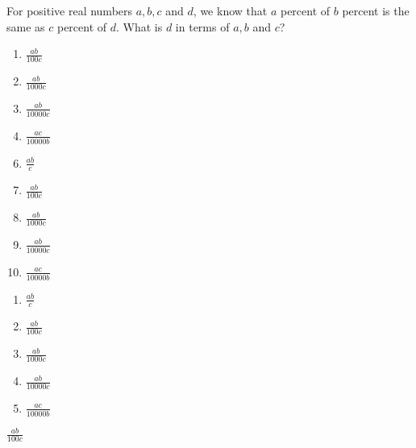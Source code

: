 

  For positive real numbers $a,b,c$ and $d$, we know that $a$ percent of $b$ percent is the same as $c$ percent of $d$.  What is $d$ in terms of $a,b$ and $c$?



\ifsat
	\begin{enumerate}[label=\Alph*)]
		\item    $\frac{ab}{100c}$ %
		\item $\frac{ab}{1000c}$
		\item  $\frac{ab}{10000c}$
		\item  $\frac{ac}{10000b}$
	\end{enumerate}
\else
\fi

\ifacteven
	\begin{enumerate}[label=\textbf{\Alph*.},itemsep=\fill,align=left]
		\setcounter{enumii}{5}
		\item    $\frac{ab}{c}$
		\item    $\frac{ab}{100c}$ %
		\item $\frac{ab}{1000c}$
		\addtocounter{enumii}{1}
		\item  $\frac{ab}{10000c}$
		\item  $\frac{ac}{10000b}$
	\end{enumerate}
\else
\fi

\ifactodd
	\begin{enumerate}[label=\textbf{\Alph*.},itemsep=\fill,align=left]
		\item    $\frac{ab}{c}$
		\item    $\frac{ab}{100c}$ %
		\item $\frac{ab}{1000c}$
		\item  $\frac{ab}{10000c}$
		\item  $\frac{ac}{10000b}$
	\end{enumerate}
\else
\fi

\ifgridin
    $\frac{ab}{100c}$ %
		
\else
\fi


